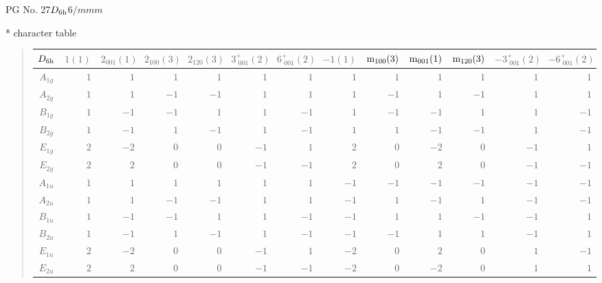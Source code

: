 \documentclass[fleqn,8pt,landscape]{jsarticle}
\begin{document}
\setcounter{MaxMatrixCols}{32}

\renewcommand{\tablename}{Table~}
\renewcommand{\figurename}{Figure~}
\begin{center}
\LARGE
PG No. 27\quad$D_{\rm 6h}$\quad$6/mmm$\quad[ hexagonal ]
\end{center}

* character table
\begin{quote}
\begin{tabular}{crrrrrrrrrrrr} \hline \hline
$ D_{\rm 6h} $ & $ 1(1) $ & $ 2{}_{001}(1) $ & $ 2{}_{100}(3) $ & $ 2{}_{120}(3) $ & $ 3^{+}_{\,\,001}(2) $ & $ 6^{+}_{\,\,001}(2) $ & $ -1(1) $ & $ {\rm m}_{100}(3) $ & $ {\rm m}_{001}(1) $ & $ {\rm m}_{120}(3) $ & $ -3^{+}_{\,\,001}(2) $ & $ -6^{+}_{\,\,001}(2) $ \\ \hline
$ A_{1g} $ & $ 1 $ & $ 1 $ & $ 1 $ & $ 1 $ & $ 1 $ & $ 1 $ & $ 1 $ & $ 1 $ & $ 1 $ & $ 1 $ & $ 1 $ & $ 1 $ \\
$ A_{2g} $ & $ 1 $ & $ 1 $ & $ -1 $ & $ -1 $ & $ 1 $ & $ 1 $ & $ 1 $ & $ -1 $ & $ 1 $ & $ -1 $ & $ 1 $ & $ 1 $ \\
$ B_{1g} $ & $ 1 $ & $ -1 $ & $ -1 $ & $ 1 $ & $ 1 $ & $ -1 $ & $ 1 $ & $ -1 $ & $ -1 $ & $ 1 $ & $ 1 $ & $ -1 $ \\
$ B_{2g} $ & $ 1 $ & $ -1 $ & $ 1 $ & $ -1 $ & $ 1 $ & $ -1 $ & $ 1 $ & $ 1 $ & $ -1 $ & $ -1 $ & $ 1 $ & $ -1 $ \\
$ E_{1g} $ & $ 2 $ & $ -2 $ & $ 0 $ & $ 0 $ & $ -1 $ & $ 1 $ & $ 2 $ & $ 0 $ & $ -2 $ & $ 0 $ & $ -1 $ & $ 1 $ \\
$ E_{2g} $ & $ 2 $ & $ 2 $ & $ 0 $ & $ 0 $ & $ -1 $ & $ -1 $ & $ 2 $ & $ 0 $ & $ 2 $ & $ 0 $ & $ -1 $ & $ -1 $ \\
$ A_{1u} $ & $ 1 $ & $ 1 $ & $ 1 $ & $ 1 $ & $ 1 $ & $ 1 $ & $ -1 $ & $ -1 $ & $ -1 $ & $ -1 $ & $ -1 $ & $ -1 $ \\
$ A_{2u} $ & $ 1 $ & $ 1 $ & $ -1 $ & $ -1 $ & $ 1 $ & $ 1 $ & $ -1 $ & $ 1 $ & $ -1 $ & $ 1 $ & $ -1 $ & $ -1 $ \\
$ B_{1u} $ & $ 1 $ & $ -1 $ & $ -1 $ & $ 1 $ & $ 1 $ & $ -1 $ & $ -1 $ & $ 1 $ & $ 1 $ & $ -1 $ & $ -1 $ & $ 1 $ \\
$ B_{2u} $ & $ 1 $ & $ -1 $ & $ 1 $ & $ -1 $ & $ 1 $ & $ -1 $ & $ -1 $ & $ -1 $ & $ 1 $ & $ 1 $ & $ -1 $ & $ 1 $ \\
$ E_{1u} $ & $ 2 $ & $ -2 $ & $ 0 $ & $ 0 $ & $ -1 $ & $ 1 $ & $ -2 $ & $ 0 $ & $ 2 $ & $ 0 $ & $ 1 $ & $ -1 $ \\
$ E_{2u} $ & $ 2 $ & $ 2 $ & $ 0 $ & $ 0 $ & $ -1 $ & $ -1 $ & $ -2 $ & $ 0 $ & $ -2 $ & $ 0 $ & $ 1 $ & $ 1 $ \\
 \hline \hline
\end{tabular}
\end{quote}
\end{document}
